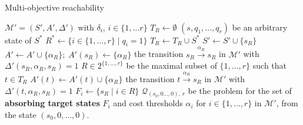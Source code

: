 \begin{algorithm}[h!]
\caption{Multi-objective reachability}\label{mosr-algo}
\begin{algorithmic}[1]
 $\mathcal{M}'=(S', A', \Delta')$ with $\delta_i$, ${i \in \{1, \dots r\}}$
  \STATE $T_R \leftarrow \emptyset$
\ENDFOR
{}
   $(s, q_1, \dots, q_r)$ be an arbitrary state of $S^*$
  \STATE $R^* \leftarrow \{ i \in \{1, \dots, r\} \; | \; q_i = 1 \}$
    \STATE $T_R \leftarrow T_R \cup S^*$
  \ENDFOR
\ENDFOR
{}
  \STATE $S' \leftarrow S' \cup \{s_R\}$
  \STATE $A' \leftarrow A' \cup \{\alpha_R\} ; \; A'(s_R) \leftarrow \{\alpha_R\}$
   the transition $s_R \xrightarrow{\alpha_R}s_R$ in $\mathcal{M'}$ with $\Delta'(s_R, \alpha_R, s_R) = 1$
\ENDFOR
{}
   $R \in 2^{\{1, \dots, r\}}$ be the maximal subset  of $\{1, \dots, r\}$ such that $t \in T_R$ \label{line-max-subset}
      \STATE $A'(t) \leftarrow A'(t) \cup \{\alpha_R\}$
       the transition $t \xrightarrow{\alpha_R}s_R$ in $\mathcal{M}'$ with $\Delta'(t, \alpha_R, s_R) = 1$
\ENDFOR
{}
  \STATE $F_i \leftarrow \{ s_R \; | \; i \in R \}$
\ENDFOR
{} $\mathcal{Q}_{(s_0, 0 \dots, 0),\, r}$ be the \MOSR{} problem for the set of \textbf{absorbing target states} $F_i$ and cost thresholds $\alpha_i$ for $i \in \{1, \dots, r\}$ in $\mathcal{M}'$, from the state $(s_0, 0, \dots, 0)$.

\end{algorithmic}
\end{algorithm}

